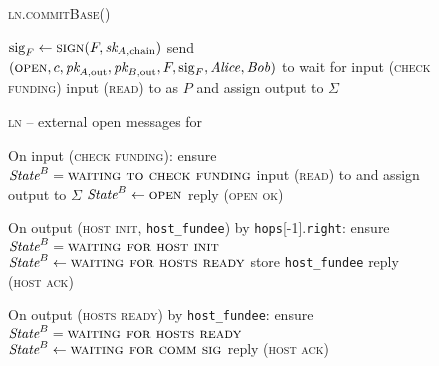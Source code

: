 \begin{figure}[H]
  \begin{processbox}{\textsc{ln.commitBase}()}
    \begin{algorithmic}[1]
      \State $\mathrm{sig}_F \gets \textsc{sign}(F, \textit{sk}_{A, \mathrm{chain}})$
      \label{code:ln:base:sign-funding}
      \State send $(\textsc{open}, c, \textit{pk}_{A, \mathrm{out}}, \textit{pk}_{B,
      \mathrm{out}}, F, \mathrm{sig}_F, \mathit{Alice}, \mathit{Bob})$ to \adversary
        \State wait for input (\textsc{check funding}) 
        \State input (\textsc{read}) to \ledger as $P$ and assign output to
        $\Sigma$
      \EndWhile
    \end{algorithmic}
  \end{processbox}
  \caption{}
  \label{code:ln:commit-base}
\end{figure}

\begin{figure}[H]
  \begin{processbox}{\textsc{ln} -- external open messages for \bob}
    \begin{algorithmic}[1]
      \State On input (\textsc{check funding}): 
      \Indent
        \State ensure $\textit{State}^B = \textsc{waiting to check funding}$
        \State input (\textsc{read}) to \ledger and assign output to $\Sigma$
          \State $\textit{State}^B \gets \textsc{open}$
          \State reply (\textsc{open ok})
        \EndIf
      \EndIndent
      \Statex

      \State On output (\textsc{host init}, \texttt{host\_fundee}) by
      \texttt{hops}[-1].\texttt{right}: 
      \Indent
        \State ensure $\textit{State}^B = \textsc{waiting for host init}$
        \State $\textit{State}^B \gets \textsc{waiting for hosts ready}$
        \State store \texttt{host\_fundee} 
        \State reply (\textsc{host ack})
      \EndIndent
      \Statex

      \State On output (\textsc{hosts ready}) by \texttt{host\_fundee}:
      \Indent
        \State ensure $\textit{State}^B = \textsc{waiting for hosts ready}$
        \State $\textit{State}^B \gets \textsc{waiting for comm sig}$
        \label{code:ln:bob:host}
        \State reply (\textsc{host ack})
      \EndIndent
    \end{algorithmic}
  \end{processbox}
  \caption{}
  \label{code:ln:bob}
\end{figure}

